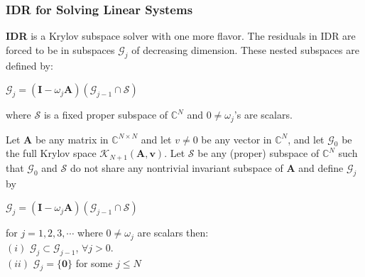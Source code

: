 \documentclass[mathserif]{beamer}
\begin{document}
\begin{frame}
 \frametitle{IDR for Solving Linear Systems}
\textbf{IDR} is a Krylov subspace solver with one more flavor. The residuals in IDR are forced to be in subspaces $\mathcal{G}_j$ of decreasing dimension.\pause
These nested subspaces are defined by: \begin{center}$\mathcal{G}_j=(\mathbf{I}-\omega_j\mathbf{A})(\mathcal{G}_{j-1} \cap \mathcal{S})$\end{center}
where $\mathcal{S}$ is a fixed proper subspace of $\mathbb{C}^N$ and $0 \ne \omega_j$'s are scalars.\\
\pause
\vspace{.1in}
\begin{theorem}
Let $\mathbf{A}$ be any matrix in $\mathbb{C}^{N \times N}$ and let $v\ne 0$ be any vector in $\mathbb{C}^N$, and let  $\mathcal{G}_0$ be the full Krylov space $\mathcal{K}_{N+1}(\mathbf{A},\mathbf{v})$. Let $\mathcal{S}$ be any (proper) subspace of $\mathbb{C}^N$ such that $\mathcal{G}_0$ and $\mathcal{S}$ do not share any nontrivial invariant subspace of $\mathbf{A}$ and define $\mathcal{G}_j$ by

\begin{center} $ \mathcal{G}_j=(\mathbf{I}-\omega_j\mathbf{A})(\mathcal{G}_{j-1} \cap \mathcal{S})$  \end{center}

for $j=1, 2, 3, \cdots$ where $0\ne \omega_j$ are scalars then:\\
\pause
$(i)$ $\mathcal{G}_j \subset \mathcal{G}_{j-1}$, $\forall j> 0.$\\
\pause
$(ii)$ $\mathcal{G}_j=\{\mathbf{0}\}$ for some $j \le N$\\
\vspace{.1in}

\end{theorem}
\end{frame}
\end{document}
